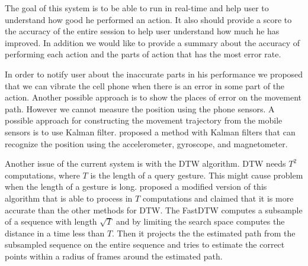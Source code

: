 The goal of this system is to be able to run in real-time and help user to understand how good he performed an action. It also should provide a score to the accuracy of the entire session to help user understand how much he has improved. In addition we would like to provide a summary about the accuracy of performing each action and the parts of action that has the most error rate.

In order to notify user about the inaccurate parts in his performance we proposed that we can vibrate the cell phone when there is an error in some part of the action. Another possible approach is to show the places of error on the movement path. However we cannot measure the position using the phone sensors. A possible approach for constructing the movement trajectory from the mobile sensors is to use Kalman filter. \cite{sabatini2006quaternion} proposed a method with Kalman filters that can recognize the position using the accelerometer, gyroscope, and magnetometer.

Another issue of the current system is with the DTW algorithm. DTW needs $T^2$ computations, where $T$ is the length of a query gesture. This might cause problem when the length of a gesture is long. \cite{salvador2007toward} proposed a modified version of this algorithm that is able to process in $T$ computations and claimed that it is more accurate than the other methods for DTW. The FastDTW computes a subsample of a sequence with length $\sqrt{T}$ and by limiting the search space computes the distance in a time less than $T$. Then it projects the the estimated path from the subsampled sequence on the entire sequence and tries to estimate the correct points within a radius of frames around the estimated path.


